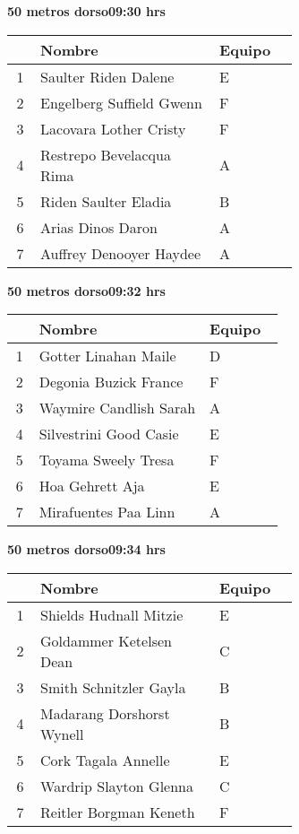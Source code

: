 \begin{minipage}{0.95\linewidth}
\begin{center}
\textbf{
50 metros dorso\hspace{1cm}09:30 hrs}
\end{center}
\begin{tabular}{cp{0.63\linewidth}l}
\hline
& \textbf{Nombre} & \textbf{Equipo} \\ \hline
1 & Saulter Riden Dalene & E \\ 
2 & Engelberg Suffield Gwenn & F \\ 
3 & Lacovara Lother Cristy & F \\ 
4 & Restrepo Bevelacqua Rima & A \\ 
5 & Riden Saulter Eladia & B \\ 
6 & Arias Dinos Daron & A \\ 
7 & Auffrey Denooyer Haydee & A \\ 
\end{tabular}
\end{minipage}
\begin{minipage}{0.95\linewidth}
\begin{center}
\textbf{
50 metros dorso\hspace{1cm}09:32 hrs}
\end{center}
\begin{tabular}{cp{0.63\linewidth}l}
\hline
& \textbf{Nombre} & \textbf{Equipo} \\ \hline
1 & Gotter Linahan Maile & D \\ 
2 & Degonia Buzick France & F \\ 
3 & Waymire Candlish Sarah & A \\ 
4 & Silvestrini Good Casie & E \\ 
5 & Toyama Sweely Tresa & F \\ 
6 & Hoa Gehrett Aja & E \\ 
7 & Mirafuentes Paa Linn & A \\ 
\end{tabular}
\end{minipage}
\begin{minipage}{0.95\linewidth}
\begin{center}
\textbf{
50 metros dorso\hspace{1cm}09:34 hrs}
\end{center}
\begin{tabular}{cp{0.63\linewidth}l}
\hline
& \textbf{Nombre} & \textbf{Equipo} \\ \hline
1 & Shields Hudnall Mitzie & E \\ 
2 & Goldammer Ketelsen Dean & C \\ 
3 & Smith Schnitzler Gayla & B \\ 
4 & Madarang Dorshorst Wynell & B \\ 
5 & Cork Tagala Annelle & E \\ 
6 & Wardrip Slayton Glenna & C \\ 
7 & Reitler Borgman Keneth & F \\ 
\end{tabular}
\end{minipage}
